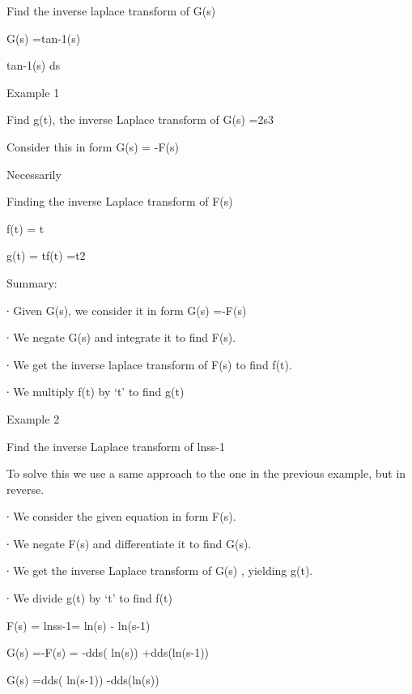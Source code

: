 Find the inverse laplace transform of G(s)


G(s) =tan-1(s)


tan-1(s) ds



\newpage 
Example 1

Find g(t), the inverse Laplace transform of G(s) =2s3

Consider this in form G(s) = -F(s)

Necessarily 

 

Finding the inverse Laplace transform of F(s)

 

f(t) = t

 


g(t) = tf(t) =t2

 

Summary:

∙       Given G(s), we consider it in form G(s) =-F(s)

∙       We negate G(s) and integrate it to find F(s).

∙       We get the inverse laplace transform of F(s) to find f(t).

∙       We multiply f(t) by ‘t’ to find g(t)

 

Example 2

Find the inverse Laplace transform of lnss-1

 

To solve this we use a same approach to the one in the previous example, but in reverse.

 

∙       We consider the given equation in form F(s).

∙       We negate F(s) and differentiate it to find G(s).

∙       We get the inverse Laplace transform of G(s) , yielding g(t).

∙       We divide g(t) by ‘t’ to find f(t)

 

 F(s) = lnss-1= ln(s) - ln(s-1)           

G(s) =-F(s) = -dds( ln(s)) +dds(ln(s-1))


G(s) =dds( ln(s-1)) -dds(ln(s))


